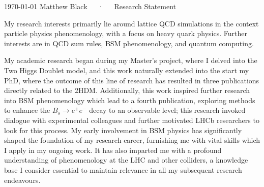 \documentclass[11pt, a4paper]{awesome-cv}
\begin{document}
\makecvheader[R]

\makecvfooter
  {\today}
  {Matthew Black~~~·~~~Research Statement}
  {}


\begin{cvletter}

My research interests primarily lie around lattice QCD simulations in the context particle physics phenomenology, with a focus on heavy quark physics.
Further interests are in QCD sum rules, BSM phenomenology, and quantum computing.

My academic research began during my Master's project, where I delved into the Two Higgs Doublet model, and this work naturally extended into the start my PhD, where the outcome of this line of research has resulted in three publications directly related to the 2HDM. 
Additionally, this work inspired further research into BSM phenomenology which lead to a fourth publication, exploring methods to enhance the $B_s\to e^+e^-$ decay to an observable level; this research invoked dialogue with experimental colleagues and further motivated LHCb researchers to look for this process.
My early involvement in BSM physics has significantly shaped the foundation of my research career, furnishing me with vital skills which I apply in my ongoing work. 
It has also imparted me with a profound understanding of phenomenology at the LHC and other colliders, a knowledge base I consider essential to maintain relevance in all my subsequent research endeavours.


\end{cvletter}
\end{document}
